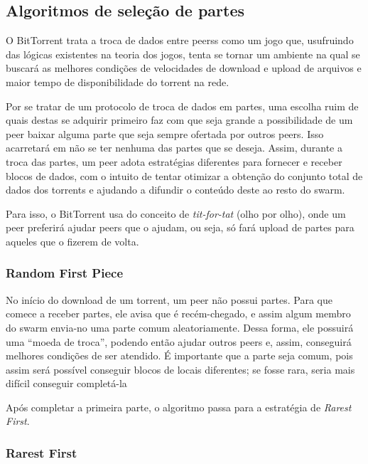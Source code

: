 
\newpage
\subsection*{Algoritmos de seleção de partes}

O BitTorrent trata a troca de dados entre \glspl*{peers} como um jogo que, usufruindo
das lógicas existentes na teoria dos jogos, tenta se tornar um ambiente na qual se
buscará as melhores condições de velocidades de download e upload de arquivos e maior
tempo de disponibilidade do \gls*{torrent} na rede.

Por se tratar de um protocolo de troca de dados em partes, uma escolha ruim de quais
destas se adquirir primeiro faz com que seja grande a possibilidade de um \gls*{peer}
baixar alguma parte que seja sempre ofertada por outros \glspl*{peer}. Isso acarretará
em não se ter nenhuma das partes que se deseja. Assim, durante a troca das partes, um
\gls*{peer} adota estratégias diferentes para fornecer e receber blocos de dados, com o
intuito de tentar otimizar a obtenção do conjunto total de dados dos \glspl*{torrent} e ajudando a difundir o conteúdo deste ao resto do \gls*{swarm}.

Para isso, o BitTorrent usa do conceito de \emph{tit-for-tat} (olho por olho), onde um
\gls*{peer} preferirá ajudar \glspl*{peer} que o ajudam, ou seja, só fará upload de
partes para aqueles que o fizerem de volta.

\subsubsection*{Random First Piece}

No início do download de um \gls*{torrent}, um \gls*{peer} não possui partes. Para que
comece a receber partes, ele avisa que é recém-chegado, e assim algum membro do
\gls*{swarm} envia-no uma parte comum aleatoriamente. Dessa forma, ele possuirá uma
``moeda de troca'', podendo então ajudar outros \glspl*{peer} e, assim, conseguirá
melhores condições de ser atendido. É importante que a parte seja comum, pois assim
será possível conseguir blocos de locais diferentes; se fosse rara, seria mais difícil
conseguir completá-la

Após completar a primeira parte, o algoritmo passa para a estratégia de \emph{Rarest
First}.

\subsubsection*{Rarest First}

